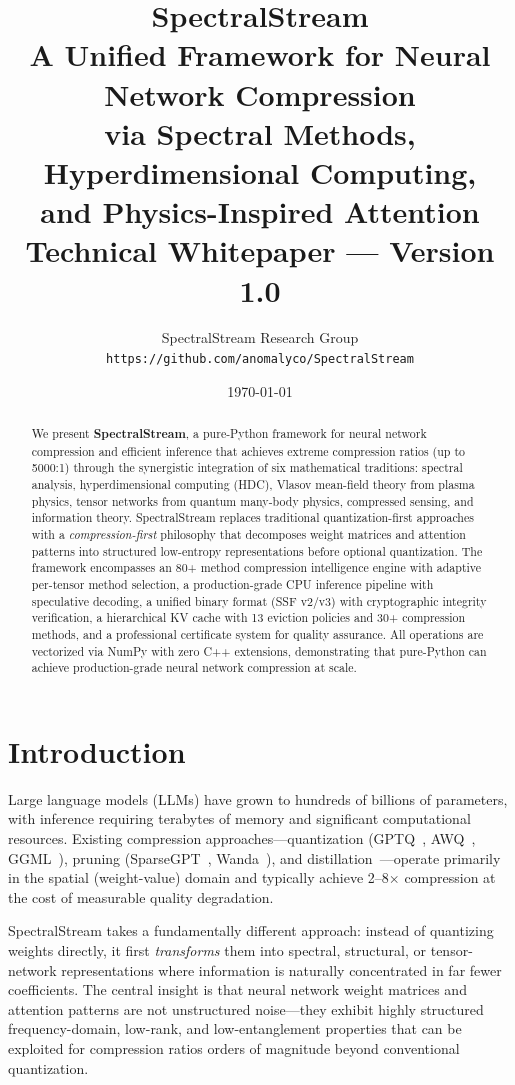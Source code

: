 \documentclass[11pt,a4paper,twocolumn]{article}
\title{\vspace{-2ex}%
  {\huge \textbf{SpectralStream}} \\
  {\Large A Unified Framework for Neural Network Compression\\
  via Spectral Methods, Hyperdimensional Computing,\\
  and Physics-Inspired Attention} \\
  \vspace{1ex}
  {\large Technical Whitepaper --- Version 1.0}%
  \vspace{-2ex}}
\author{%
  SpectralStream Research Group \\
  \texttt{https://github.com/anomalyco/SpectralStream}%
}
\date{\today}
\begin{document}
\maketitle

\begin{abstract}
	We present \textbf{SpectralStream}, a pure-Python framework for neural network compression and efficient inference that achieves extreme compression ratios (up to 5000:1) through the synergistic integration of six mathematical traditions: spectral analysis, hyperdimensional computing (HDC), Vlasov mean-field theory from plasma physics, tensor networks from quantum many-body physics, compressed sensing, and information theory. SpectralStream replaces traditional quantization-first approaches with a \emph{compression-first} philosophy that decomposes weight matrices and attention patterns into structured low-entropy representations before optional quantization. The framework encompasses an 80+ method compression intelligence engine with adaptive per-tensor method selection, a production-grade CPU inference pipeline with speculative decoding, a unified binary format (SSF v2/v3) with cryptographic integrity verification, a hierarchical KV cache with 13 eviction policies and 30+ compression methods, and a professional certificate system for quality assurance. All operations are vectorized via NumPy with zero C++ extensions, demonstrating that pure-Python can achieve production-grade neural network compression at scale.
\end{abstract}

\section{Introduction}

Large language models (LLMs) have grown to hundreds of billions of parameters, with inference requiring terabytes of memory and significant computational resources. Existing compression approaches---quantization (GPTQ~\cite{frantar2023gptq}, AWQ~\cite{lin2024awq}, GGML~\cite{gerganov2023ggml}), pruning (SparseGPT~\cite{frantar2023sparsegpt}, Wanda~\cite{sun2023wanda}), and distillation~\cite{hinton2015distilling}---operate primarily in the spatial (weight-value) domain and typically achieve 2--8$\times$ compression at the cost of measurable quality degradation.

SpectralStream takes a fundamentally different approach: instead of quantizing weights directly, it first \emph{transforms} them into spectral, structural, or tensor-network representations where information is naturally concentrated in far fewer coefficients. The central insight is that neural network weight matrices and attention patterns are not unstructured noise---they exhibit highly structured frequency-domain, low-rank, and low-entanglement properties that can be exploited for compression ratios orders of magnitude beyond conventional quantization.
\end{document}
